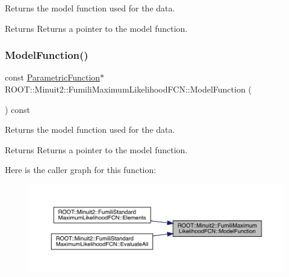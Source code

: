 Returns the model function used for the data.

\begin{DoxyReturn}{Returns}
Returns a pointer to the model function. 
\end{DoxyReturn}
\mbox{\label{classROOT_1_1Minuit2_1_1FumiliMaximumLikelihoodFCN_ae1ea41126186d9dd5c83fdcec08cff70}} 
\subsubsection{\texorpdfstring{ModelFunction()}{ModelFunction()}\hspace{0.1cm}{\footnotesize\ttfamily [3/3]}}
{\footnotesize\ttfamily const \mbox{\hyperlink{classROOT_1_1Minuit2_1_1ParametricFunction}{Parametric\+Function}}$\ast$ R\+O\+O\+T\+::\+Minuit2\+::\+Fumili\+Maximum\+Likelihood\+F\+C\+N\+::\+Model\+Function (\begin{DoxyParamCaption}{ }\end{DoxyParamCaption}) const\hspace{0.3cm}{\ttfamily [inline]}}

Returns the model function used for the data.

\begin{DoxyReturn}{Returns}
Returns a pointer to the model function. 
\end{DoxyReturn}
Here is the caller graph for this function\+:
\nopagebreak
\begin{figure}[H]
\begin{center}
\leavevmode
\includegraphics[width=350pt]{dd/d54/classROOT_1_1Minuit2_1_1FumiliMaximumLikelihoodFCN_ae1ea41126186d9dd5c83fdcec08cff70_icgraph}
\end{center}
\end{figure}
\mbox{\label{classROOT_1_1Minuit2_1_1FumiliMaximumLikelihoodFCN_ad06826a1cde84be6bf2a13518c768ca5}} 

